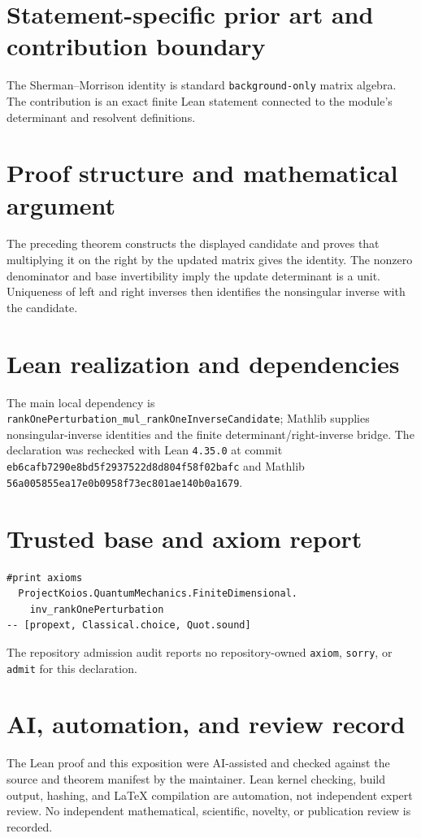 \documentclass[11pt]{article}
\begin{document}
\section{Statement-specific prior art and contribution boundary}
The Sherman--Morrison identity is standard \texttt{background-only} matrix algebra.  The contribution is an exact finite Lean statement connected to the module's determinant and resolvent definitions.

\section{Proof structure and mathematical argument}
The preceding theorem constructs the displayed candidate and proves that multiplying it on the right by the updated matrix gives the identity.  The nonzero denominator and base invertibility imply the update determinant is a unit.  Uniqueness of left and right inverses then identifies the nonsingular inverse with the candidate.

\section{Lean realization and dependencies}
The main local dependency is \texttt{rankOnePerturbation\_mul\_rankOneInverseCandidate}; Mathlib supplies nonsingular-inverse identities and the finite determinant/right-inverse bridge.  The declaration was rechecked with Lean \texttt{4.35.0} at commit \texttt{eb6cafb7290e8bd5f2937522d8d804f58f02bafc} and Mathlib \texttt{56a005855ea17e0b0958f73ec801ae140b0a1679}.

\section{Trusted base and axiom report}
\begin{verbatim}
#print axioms
  ProjectKoios.QuantumMechanics.FiniteDimensional.
    inv_rankOnePerturbation
-- [propext, Classical.choice, Quot.sound]
\end{verbatim}
The repository admission audit reports no repository-owned \texttt{axiom}, \texttt{sorry}, or
\texttt{admit} for this declaration.

\section{AI, automation, and review record}
The Lean proof and this exposition were AI-assisted and checked against the source and theorem
manifest by the maintainer.  Lean kernel checking, build output, hashing, and LaTeX compilation are
automation, not independent expert review.  No independent mathematical, scientific, novelty, or
publication review is recorded.
\end{document}
